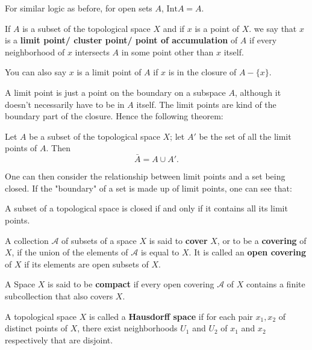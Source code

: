 \documentclass[12pt]{article}
\begin{document}
For similar logic as before, for open sets $A$, $\text{Int} A = A$. 

\begin{definition}
  If $A$ is a subset of the topological space $X$ and if $x$ is a point of $X$. we say that $x$ is a
  \textbf{limit point/ cluster point/ point of accumulation} of $A$ if every neighborhood of $x$ intersects $A$ in some point other than 
  $x$ itself.
  \par You can also say $x$ is a limit point of $A$ if $x$ is in the closure of $A - \{ x \}$.
\end{definition}

A limit point is just a point on the boundary on a subspace $A$, although it doesn't necessarily have to be in $A$ itself. The 
limit points are kind of the boundary part of the closure. Hence the following theorem:

\begin{theorem}{}
  Let $A$ be a subset of the topological space $X$; let $A'$ be the set of all the limit points of $A$. Then 
  $$ \bar{A} = A \cup A'. $$
\end{theorem}

One can then consider the relationship between limit points and a set being closed. If the "boundary" of a set is 
made up of limit points, one can see that:

\begin{theorem}{}
  A subset of a topological space is closed if and only if it contains all its limit points.
\end{theorem}

\begin{definition}
  A collection $\mathcal{A}$ of subsets of a space $X$ is said to \textbf{cover} $X$, or to be a \textbf{covering} of $X$, if the union
  of the elements of $\mathcal{A}$ is equal to $X$. It is called an \textbf{open covering} of $X$ if its elements
  are open subsets of $X$.
\end{definition}

\begin{definition}
  A Space $X$ is said to be \textbf{compact} if every open covering $\mathcal{A}$ of $X$ contains a finite subcollection
  that also covers $X$. 
\end{definition}

\begin{definition}
  A topological space $X$ is called a \textbf{Hausdorff space} if for each pair $x_1,x_2$ of distinct points of $X$, 
  there exist neighborhoods $U_1$ and $U_2$ of $x_1$ and $x_2$ respectively that are disjoint.
\end{definition}
\end{document}
